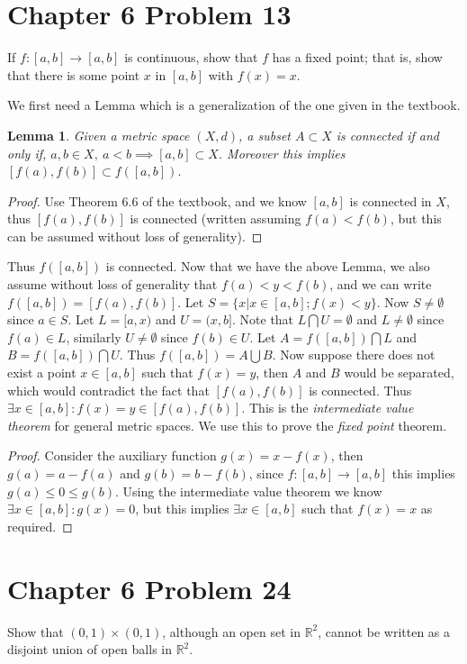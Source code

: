 \documentclass{article}
\newtheorem{lem}{Lemma}
\newtheorem{proof}{Proof}
\def\le{\leqslant}
\def\to{\rightarrow}
\def\RR{\mathbb R}
\begin{document}
\section{Chapter 6 Problem 13}
If $f:[a,b]\to [a,b]$ is continuous, show that $f$ has a fixed point; that
is, show that there is some point $x$ in $[a,b]$ with $f(x)=x$.

We first need a Lemma which is a generalization of the one given
in the textbook.
\begin{lem}
Given a metric space $(X,d)$, a subset $A\subset X$ is 
connected if and only if, $a,b\in X,\ a<b \implies [a,b] \subset X$.
Moreover this implies $[f(a),f(b)]\subset f([a,b])$.
\end{lem}
\begin{proof}
Use Theorem 6.6 of the textbook, and we know $[a,b]$ is connected
in $X$, thus $[f(a),f(b)]$ is connected (written assuming $f(a)<f(b)$,
but this can be assumed without loss of generality).
\end{proof}

Thus $f([a,b])$ is connected.
Now that we have the above Lemma, we also assume without loss of
generality that $f(a) < y < f(b)$, and we can write $f([a,b])=[f(a),f(b)]$.
Let $S=\{x|x\in [a,b]; f(x) < y\}$.
Now $S\ne\emptyset$ since $a\in S$. Let $L=[a,x)$ and $U=(x,b]$.
Note that $L\bigcap U=\emptyset$ and $L\ne\emptyset$ since $f(a)\in L$,
similarly $U\ne\emptyset$ since $f(b)\in U$.
Let $A=f([a,b])\bigcap L$ and $B=f([a,b])\bigcap U$.
Thus $f([a,b])= A\bigcup B$. Now suppose there does not exist a point
$x\in [a,b]$ such that $f(x)=y$, then $A$ and $B$ would be separated, which
would contradict the fact that $[f(a),f(b)]$ is connected. Thus 
$\exists x\in [a,b]: f(x)=y\in [f(a),f(b)]$.
This is the \emph{intermediate value theorem} for general metric spaces.
We use this to prove the \emph{fixed point} theorem.
\begin{proof}
Consider the auxiliary function $g(x)=x-f(x)$, then
$g(a)=a-f(a)$ and $g(b)=b-f(b)$, since $f:[a,b]\to [a,b]$ this
implies $g(a) \le 0 \le g(b)$. Using the intermediate value theorem
we know $\exists x\in [a,b]: g(x)=0$, but this implies $\exists x\in [a,b]$
such that $f(x)=x$ as required.
\end{proof}

\section{Chapter 6 Problem 24}
Show that $(0,1)\times(0,1)$, although an open set in $\RR^2$,
cannot be written as a disjoint union of open balls in $\RR^2$.
\end{document}

